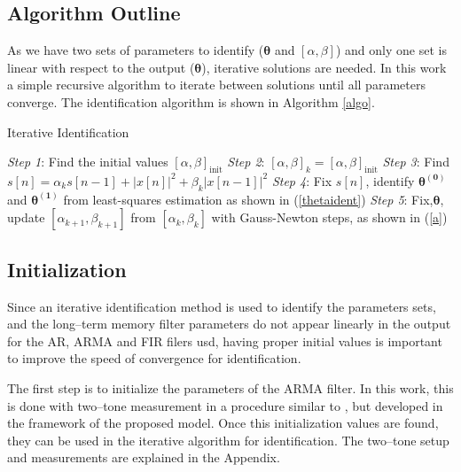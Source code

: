 \documentclass[journal]{IEEEtran}
\begin{document}
\subsection{Algorithm Outline}
As we have two sets of parameters to identify ($\bm{\theta}$ and $[\alpha,\beta]$) and only one set is linear with respect to the output ($\bm{\theta}$), iterative solutions are needed. In this work a simple recursive algorithm to iterate between solutions until all parameters converge.  The identification algorithm is shown in Algorithm \ref{algo}.
\begin{algorithm}
                \caption{Iterative Identification}
                \label{algorithm}
                \begin{algorithmic}
                                \STATE \emph{Step 1}: Find the initial values $[\alpha,\beta]_{\text{init}}$
                                \STATE \emph{Step 2}: $[\alpha,\beta]_{k} = [\alpha,\beta]_{\text{init}}$
                                \REPEAT
                                                \STATE \emph{Step 3}: Find $s[n] = \alpha_{k} s[n-1] + |x[n]|^2 + \beta_k|x[n-1]|^2 $
                                                \STATE \emph{Step 4}: Fix $s[n]$, identify $\mathbf{\theta^{(0)}}$ and $\mathbf{\theta^{(1)}}$ from least-squares estimation as shown in (\ref{thetaident})
                                                \REPEAT
                                                    \STATE \emph{Step 5}: Fix,$\bm{\theta}$, update $[\alpha_{k+1},\beta_{k+1}]$ from $[\alpha_{k},\beta_{k}]$ with Gauss-Newton steps, as shown in (\ref{a})
                \end{algorithmic}
                \label{algo}
\end{algorithm}

\subsection{Initialization}
Since an iterative identification method is used to identify the parameters sets, and the long--term memory filter 
parameters do not appear linearly in the output for the AR, ARMA and FIR filers usd, having proper initial values 
is important to improve the speed of convergence for identification. 

The first step is to initialize the parameters of the ARMA
filter. In this work, this is done with two--tone measurement in a procedure similar to \cite{ku2003}, but developed
in the framework of the proposed model. Once this initialization values are found, they can be used in the iterative
algorithm for identification. The two--tone setup and measurements are explained in the Appendix. 
\end{document}

